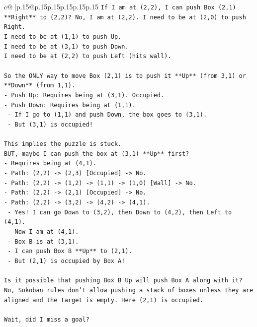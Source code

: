 \documentclass{article}
\begin{document}
{\begin{supertabular}{c@{$\;$}|p{.15\linewidth}@{}p{.15\linewidth}p{.15\linewidth}p{.15\linewidth}p{.15\linewidth}p{.15\linewidth}}
{{{\texttt{If I am at (2,2), I can push Box (2,1) **Right** to (2,2)? No, I am at (2,2). I need to be at (2,0) to push Right.} \\
\texttt{I need to be at (1,1) to push Up.} \\
\texttt{I need to be at (3,1) to push Down.} \\
\texttt{I need to be at (2,2) to push Left (hits wall).} \\
\\ 
\texttt{So the ONLY way to move Box (2,1) is to push it **Up** (from 3,1) or **Down** (from 1,1).} \\
\texttt{{-} Push Up: Requires being at (3,1). Occupied.} \\
\texttt{{-} Push Down: Requires being at (1,1).} \\
\texttt{  {-} If I go to (1,1) and push Down, the box goes to (3,1).} \\
\texttt{  {-} But (3,1) is occupied!} \\
\\ 
\texttt{This implies the puzzle is stuck.} \\
\texttt{BUT, maybe I can push the box at (3,1) **Up** first?} \\
\texttt{{-} Requires being at (4,1).} \\
\texttt{{-} Path: (2,2) {-}> (2,3) {[}Occupied{]} {-}> No.} \\
\texttt{{-} Path: (2,2) {-}> (1,2) {-}> (1,1) {-}> (1,0) {[}Wall{]} {-}> No.} \\
\texttt{{-} Path: (2,2) {-}> (2,1) {[}Occupied{]} {-}> No.} \\
\texttt{{-} Path: (2,2) {-}> (3,2) {-}> (4,2) {-}> (4,1).} \\
\texttt{  {-} Yes! I can go Down to (3,2), then Down to (4,2), then Left to (4,1).} \\
\texttt{  {-} Now I am at (4,1).} \\
\texttt{  {-} Box B is at (3,1).} \\
\texttt{  {-} I can push Box B **Up** to (2,1).} \\
\texttt{  {-} But (2,1) is occupied by Box A!} \\
\\ 
\texttt{Is it possible that pushing Box B Up will push Box A along with it? No, Sokoban rules don't allow pushing a stack of boxes unless they are aligned and the target is empty. Here (2,1) is occupied.} \\
\\ 
\texttt{Wait, did I miss a goal?} \\
}}}
\end{supertabular}}
\end{document}
